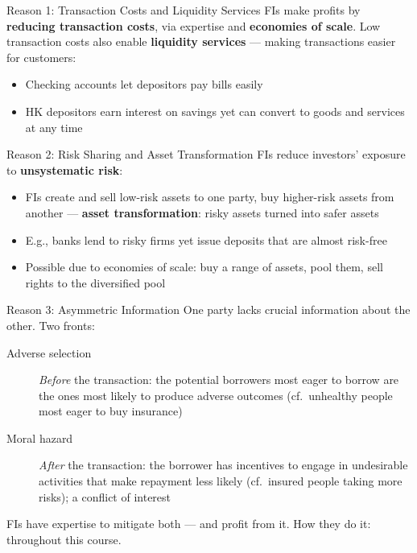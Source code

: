 \documentclass[aspectratio=169]{beamer}
\begin{document}
\begin{frame}{Reason 1: Transaction Costs and Liquidity Services}
FIs make profits by \textbf{reducing transaction costs}, via expertise and \textbf{economies of scale}.
\vspace{0.4em}
Low transaction costs also enable \textbf{liquidity services} --- making transactions easier for customers:
\begin{itemize}
  \item Checking accounts let depositors pay bills easily
  \item HK depositors earn interest on savings yet can convert to goods and services at any time
\end{itemize}
\end{frame}

\begin{frame}{Reason 2: Risk Sharing and Asset Transformation}
FIs reduce investors' exposure to \textbf{unsystematic risk}:
\begin{itemize}
  \item FIs create and sell low-risk assets to one party, buy higher-risk assets from another --- \textbf{asset transformation}: risky assets turned into safer assets
  \item E.g., banks lend to risky firms yet issue deposits that are almost risk-free
  \item Possible due to economies of scale: buy a range of assets, pool them, sell rights to the diversified pool
\end{itemize}
\end{frame}

\begin{frame}{Reason 3: Asymmetric Information}
One party lacks crucial information about the other. Two fronts:
\vspace{0.3em}
\begin{description}
  \item[Adverse selection] \emph{Before} the transaction: the potential borrowers most eager to borrow are the ones most likely to produce adverse outcomes (cf.\ unhealthy people most eager to buy insurance)
  \item[Moral hazard] \emph{After} the transaction: the borrower has incentives to engage in undesirable activities that make repayment less likely (cf.\ insured people taking more risks); a conflict of interest
\end{description}
\vspace{0.3em}
FIs have expertise to mitigate both --- and profit from it. How they do it: throughout this course.
\end{frame}
\end{document}

